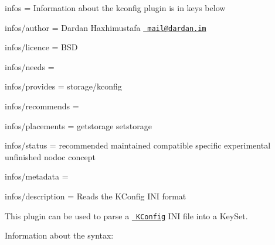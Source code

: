
\begin{DoxyItemize}
\item infos = Information about the kconfig plugin is in keys below
\item infos/author = Dardan Haxhimustafa \href{mailto:mail@dardan.im}{\texttt{ mail@dardan.\+im}}
\item infos/licence = B\+SD
\item infos/needs =
\item infos/provides = storage/kconfig
\item infos/recommends =
\item infos/placements = getstorage setstorage
\item infos/status = recommended maintained compatible specific experimental unfinished nodoc concept
\item infos/metadata =
\item infos/description = Reads the K\+Config I\+NI format
\end{DoxyItemize}

This plugin can be used to parse a \href{https://cgit.kde.org/kconfig.git}{\texttt{ K\+Config}} I\+NI file into a Key\+Set.

Information about the syntax\+:


